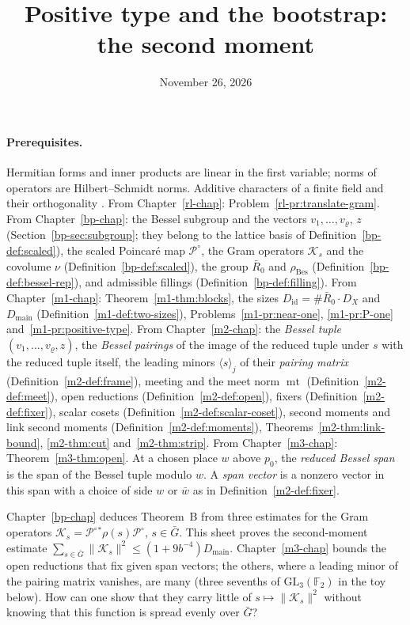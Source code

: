 \documentclass[reqno]{amsart}
\title{Positive type and the bootstrap: the second moment}
\author{}
\date{November 26, 2026}
\newcounter{chap}
\theoremstyle{definition}
\theoremstyle{plain}
\theoremstyle{remark}
\newcommand{\F}{\mathbb{F}}
\newcommand{\GL}{\mathrm{GL}}
\newcommand{\Gb}{\bar G}
\newcommand{\Rb}{\bar R_0}
\newcommand{\Pco}{{\mathcal P^\circ}}
\newcommand{\Kc}{\mathcal K}
\newcommand{\Did}{D_{\mathrm{id}}}
\newcommand{\Dmain}{D_{\mathrm{main}}}
\newcommand{\mt}{\operatorname{mt}}
\newcommand{\rBes}{\rho_{\mathrm{Bes}}}
\begin{document}
\maketitle
{}\label{chap}

\paragraph{Prerequisites.}
Hermitian forms and inner products are linear in the first variable; norms of operators are Hilbert--Schmidt norms.  Additive characters of a finite field and their orthogonality \cite[Ch.~5, \S1]{LN}.  From Chapter~\ref{rl-chap}: Problem~\ref{rl-pr:translate-gram}.  From Chapter~\ref{bp-chap}: the Bessel subgroup and the vectors \(v_1,\dots,v_\varrho\), \(z\) (Section~\ref{bp-sec:subgroup}; they belong to the lattice basis of Definition~\ref{bp-def:scaled}), the scaled Poincar\'e map \(\Pco\), the Gram operators \(\Kc_s\) and the covolume \(\nu\) (Definition~\ref{bp-def:scaled}), the group \(\Rb\) and \(\rBes\) (Definition~\ref{bp-def:bessel-rep}), and admissible fillings (Definition~\ref{bp-def:filling}).  From Chapter~\ref{m1-chap}: Theorem~\ref{m1-thm:blocks}, the sizes \(\Did=\#\Rb\cdot D_X\) and \(\Dmain\) (Definition~\ref{m1-def:two-sizes}), Problems~\ref{m1-pr:near-one}, \ref{m1-pr:P-one} and~\ref{m1-pr:positive-type}.  From Chapter~\ref{m2-chap}: the \emph{Bessel tuple} \((v_1,\dots,v_\varrho,z)\), the \emph{Bessel pairings} of the image of the reduced tuple under \(s\) with the reduced tuple itself, the leading minors \(\langle s\rangle_j\) of their \emph{pairing matrix} (Definition~\ref{m2-def:frame}), meeting and the meet norm \(\mt\) (Definition~\ref{m2-def:meet}), open reductions (Definition~\ref{m2-def:open}), fixers (Definition~\ref{m2-def:fixer}), scalar cosets (Definition~\ref{m2-def:scalar-coset}), second moments and link second moments (Definition~\ref{m2-def:moments}), Theorems~\ref{m2-thm:link-bound}, \ref{m2-thm:cut} and~\ref{m2-thm:strip}.  From Chapter~\ref{m3-chap}: Theorem~\ref{m3-thm:open}.  At a chosen place \(w\) above \(p_0\), the \emph{reduced Bessel span} is the span of the Bessel tuple modulo \(w\).  A \emph{span vector} is a nonzero vector in this span with a choice of side \(w\) or \(\bar w\) as in Definition~\ref{m2-def:fixer}.

\medskip
Chapter~\ref{bp-chap} deduces Theorem~B from three estimates for the Gram operators \(\Kc_s=\Pco{}^*\rho(s)\Pco\), \(s\in\Gb\).  This sheet proves the second-moment estimate \(\sum_{s\in\Gb}\lVert\Kc_s\rVert^2\le(1+9b^{-4})\Dmain\).  Chapter~\ref{m3-chap} bounds the open reductions that fix given span vectors; the others, where a leading minor of the pairing matrix vanishes, are many (three sevenths of \(\GL_3(\F_2)\) in the toy below).  How can one show that they carry little of \(s\mapsto\lVert\Kc_s\rVert^2\) without knowing that this function is spread evenly over \(\Gb\)?
\end{document}
